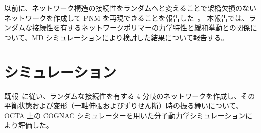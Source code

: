 \documentclass[uplatex,10pt,a4paper,twocolumn]{jsarticle}
\begin{document}
以前に、ネットワーク構造の接続性をランダムへと変えることで架橋欠損のないネットワークを作成して PNM を再現できることを報告した~\cite{sasaki}。
本報告では、ランダムな接続性を有するネットワークポリマーの力学特性と緩和挙動との関係について、MD シミュレーションにより検討した結果について報告する。





\section{シミュレーション}


既報~\cite{sasaki}に従い、ランダムな接続性を有する 4 分岐のネットワークを作成し、その平衡状態および変形（一軸伸張およびずりせん断）時の振る舞いについて、OCTA 上の COGNAC シミュレーターを用いた分子動力学シミュレーションにより評価した。
\end{document}
